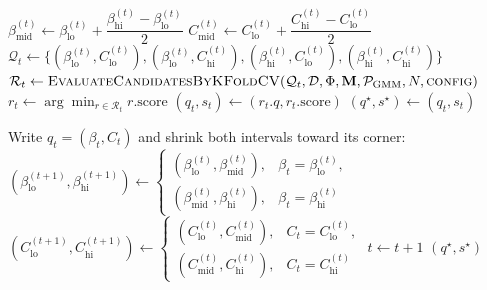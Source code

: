 \begin{algorithm}[ht]
\begin{algorithmic}[1]
    \State $\beta_{\mathrm{mid}}^{(t)}\gets
           \beta_{\mathrm{lo}}^{(t)}+
           \dfrac{\beta_{\mathrm{hi}}^{(t)}-\beta_{\mathrm{lo}}^{(t)}}{2}$
    \State $C_{\mathrm{mid}}^{(t)}\gets
           C_{\mathrm{lo}}^{(t)}+
           \dfrac{C_{\mathrm{hi}}^{(t)}-C_{\mathrm{lo}}^{(t)}}{2}$
    \State $\mathcal Q_t\gets\{
           (\beta_{\mathrm{lo}}^{(t)},C_{\mathrm{lo}}^{(t)}),
           (\beta_{\mathrm{lo}}^{(t)},C_{\mathrm{hi}}^{(t)}),
           (\beta_{\mathrm{hi}}^{(t)},C_{\mathrm{lo}}^{(t)}),
           (\beta_{\mathrm{hi}}^{(t)},C_{\mathrm{hi}}^{(t)})\}$
    \State $\mathcal R_t\gets
           \textsc{EvaluateCandidatesByKFoldCV}
           (\mathcal Q_t,\mathcal D,\Phi,\mathbf M,
            \mathcal P_{\mathrm{GMM}},N,\textsc{config})$
    \State $r_t\gets\arg\min_{r\in\mathcal R_t}r.\text{score}$
    \State $(q_t,s_t)\gets(r_t.q,r_t.\text{score})$
      \State $(q^\star,s^\star)\gets(q_t,s_t)$
    \EndIf

    \State Write $q_t=(\beta_t,C_t)$ and shrink both intervals toward its corner:
    \State $(\beta_{\mathrm{lo}}^{(t+1)},\beta_{\mathrm{hi}}^{(t+1)})\gets
           \begin{cases}
             (\beta_{\mathrm{lo}}^{(t)},\beta_{\mathrm{mid}}^{(t)}),
               & \beta_t=\beta_{\mathrm{lo}}^{(t)},\\
             (\beta_{\mathrm{mid}}^{(t)},\beta_{\mathrm{hi}}^{(t)}),
               & \beta_t=\beta_{\mathrm{hi}}^{(t)}
           \end{cases}$
    \State $(C_{\mathrm{lo}}^{(t+1)},C_{\mathrm{hi}}^{(t+1)})\gets
           \begin{cases}
             (C_{\mathrm{lo}}^{(t)},C_{\mathrm{mid}}^{(t)}),
               & C_t=C_{\mathrm{lo}}^{(t)},\\
             (C_{\mathrm{mid}}^{(t)},C_{\mathrm{hi}}^{(t)}),
               & C_t=C_{\mathrm{hi}}^{(t)}
           \end{cases}$
    \State $t\gets t+1$
  \EndWhile
  \State \Return $(q^\star,s^\star)$
\EndProcedure
\end{algorithmic}
\end{algorithm}

